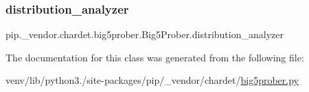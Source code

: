 \subsubsection{\texorpdfstring{distribution\+\_\+analyzer}{distribution\_analyzer}}
{\footnotesize\ttfamily pip.\+\_\+vendor.\+chardet.\+big5prober.\+Big5\+Prober.\+distribution\+\_\+analyzer}



The documentation for this class was generated from the following file\+:\begin{DoxyCompactItemize}
\item 
venv/lib/python3./site-\/packages/pip/\+\_\+vendor/chardet/\hyperlink{big5prober_8py}{big5prober.\+py}\end{DoxyCompactItemize}
